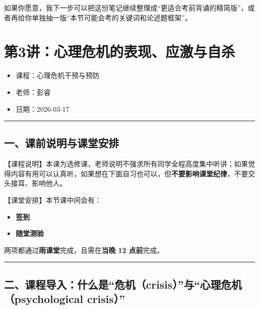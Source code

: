 \documentclass[
  chinese,
  9pt,
  a4paper,
]{ctexart}
\providecommand{\tightlist}{%
  \setlength{\itemsep}{0pt}\setlength{\parskip}{0pt}}
\begin{document}
如果你愿意，我下一步可以把这份笔记继续整理成``更适合考前背诵的精简版''，或者再给你单独抽一版``本节可能会考的关键词和论述题框架''。

\clearpage

\section{第3讲：心理危机的表现、应激与自杀}\label{ux7b2c3ux8bb2ux5fc3ux7406ux5371ux673aux7684ux8868ux73b0ux5e94ux6fc0ux4e0eux81eaux6740}

\begin{itemize}
\tightlist
\item
  课程：心理危机干预与预防
\item
  老师：彭睿
\item
  日期：2026-03-17
\end{itemize}

\begin{center}\rule{0.5\linewidth}{0.5pt}\end{center}

\subsection{一、课前说明与课堂安排}\label{ux4e00ux8bfeux524dux8bf4ux660eux4e0eux8bfeux5802ux5b89ux6392}

【课程说明】本课为选修课，老师说明不强求所有同学全程高度集中听讲；如果觉得内容有用可以认真听，如果想在下面自习也可以，但\textbf{不要影响课堂纪律}，不要交头接耳、影响他人。

【课堂安排】本节课中间会有：

\begin{itemize}
\tightlist
\item
  \textbf{签到}
\item
  \textbf{随堂测验}
\end{itemize}

两项都通过\textbf{雨课堂}完成，且需在\textbf{当晚 12 点前}完成。

\begin{center}\rule{0.5\linewidth}{0.5pt}\end{center}

\subsection{二、课程导入：什么是``危机（crisis）''与``心理危机（psychological
crisis）''}\label{ux4e8cux8bfeux7a0bux5bfcux5165ux4ec0ux4e48ux662fux5371ux673acrisisux4e0eux5fc3ux7406ux5371ux673apsychological-crisis}
\end{document}
